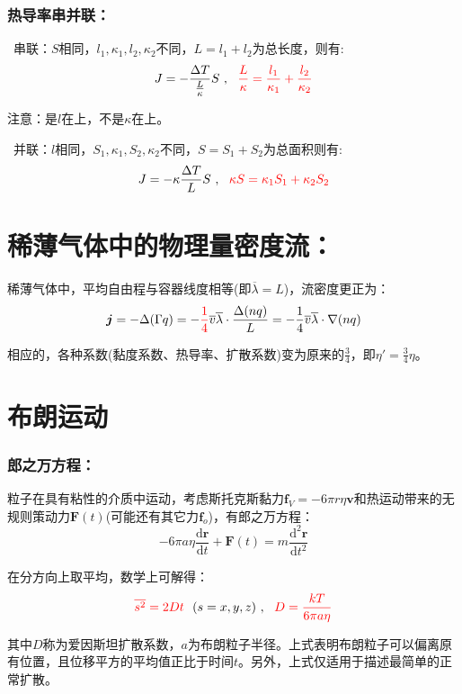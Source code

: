 \documentclass[zihao=-4,UTF8]{report}
\begin{document}
\subsubsection{热导率串并联：}
\ 串联：$S$相同，$l_1,\kappa_1,l_2,\kappa_2$不同，$L=l_1+l_2$为总长度，则有:
\begin{equation}
    J = -\frac{\Delta T}{\frac{L}{\kappa}}S\ ,\ \ {\color{red}\frac{L}{\kappa} = \frac{l_1}{\kappa_1} +\frac{l_2}{\kappa_2}}
\end{equation}\par
{\par\color{gray}\small
注意：是$l$在上，不是$\kappa$在上。
\par}

\ 并联：$l$相同，$S_1,\kappa_1,S_2,\kappa_2$不同，$S=S_1+S_2$为总面积则有:
\begin{equation}
    J = -\kappa\frac{\Delta T}{L}S\ ,\ \ {\color{red}\kappa S = \kappa_1 S_1 +\kappa_2 S_2}
\end{equation}
\section{稀薄气体中的物理量密度流：}
稀薄气体中，平均自由程与容器线度相等(即$\overline{\lambda} = L$)，流密度更正为：
\begin{equation}
    \boldsymbol{j} = -\Delta (\Gamma q) =  - \textcolor{red}{\frac{1}{4} } \overline{v}\overline{\lambda} \cdot \frac{\Delta (nq)}{L} = - \frac{1}{4} \overline{v}\overline{\lambda} \cdot \nabla(nq)
\end{equation}\par
相应的，各种系数(黏度系数、热导率、扩散系数)变为原来的$\frac{3}{4}$，即$\eta' = \frac{3}{4}\eta$。
\section{布朗运动}
\subsubsection{郎之万方程：}
粒子在具有粘性的介质中运动，考虑斯托克斯黏力$\boldsymbol{f}_V = -6\pi r\eta\boldsymbol{v}$和热运动带来的无规则策动力$\boldsymbol{F}(t)$(可能还有其它力$\boldsymbol{f}_o$)，有郎之万方程：
\begin{equation}
    -6\pi a\eta\frac{\mathrm{d}\boldsymbol{r}}{\mathrm{d}t } + \boldsymbol{F}(t) = m\frac{\mathrm{d}^2\boldsymbol{r}}{\mathrm{d}t^2}
\end{equation}\par 
在分方向上取平均，数学上可解得：
\begin{equation}
    \textcolor{red}{\overline{s^2}  = 2Dt}\ \ (s = x,y,z)\ ,\ \  \textcolor{red}{D = \frac{kT}{6\pi a \eta }}
\end{equation}\par
{\color{gray}\small 其中$D$称为爱因斯坦扩散系数，$a$为布朗粒子半径。上式表明布朗粒子可以偏离原有位置，且位移平方的平均值正比于时间$t$。另外，上式仅适用于描述最简单的正常扩散。} 
\end{document}
